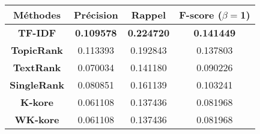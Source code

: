 \begin{tabular}{|c|c|c|c|}
\hline 
\textbf{Méthodes} & \textbf{Précision} & \textbf{Rappel} & \textbf{F-score ($\beta=$1)} \\ 
\hline 
\textbf{TF-IDF} & \textbf{0.109578} & \textbf{0.224720} & \textbf{0.141449} \\ 
\hline 
\textbf{TopicRank} & 0.113393 & 0.192843 & 0.137803 \\ 
\hline 
\textbf{TextRank} & 0.070034 & 0.141180 & 0.090226 \\ 
\hline 
\textbf{SingleRank} & 0.080851 & 0.161139 & 0.103241 \\ 
\hline 
\textbf{K-kore} & 0.061108 & 0.137436 & 0.081968 \\ 
\hline 
\textbf{WK-kore} & 0.061108 & 0.137436 & 0.081968 \\ 
\hline 
\end{tabular}